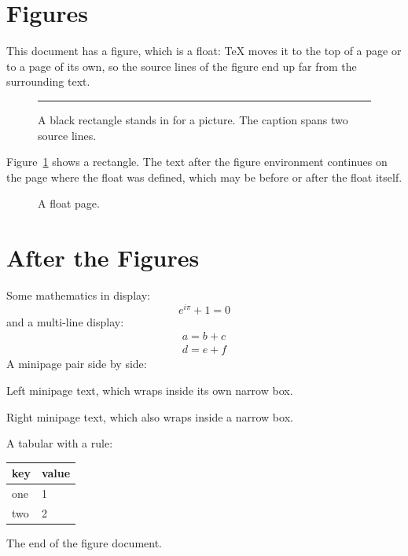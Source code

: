 \documentclass{article}
\begin{document}
\section{Figures}
This document has a figure, which is a float:
TeX moves it to the top of a page or to a page of its own,
so the source lines of the figure end up far from the surrounding text.

\begin{figure}[t]
  \centering
  \rule{0.6\textwidth}{4cm}
  \caption{A black rectangle stands in for a picture.
    The caption spans two source lines.}
  \label{fig:rect}
\end{figure}

Figure~\ref{fig:rect} shows a rectangle.
The text after the figure environment continues on the page where the float was defined,
which may be before or after the float itself.

\begin{figure}[p]
  \centering
  \caption{A float page.}
\end{figure}

\section{After the Figures}
Some mathematics in display:
\[
  e^{i\pi} + 1 = 0
\]
and a multi-line display:
\begin{gather}
  a = b + c \\
  d = e + f
\end{gather}
A minipage pair side by side:

\noindent
\begin{minipage}{0.45\textwidth}
Left minipage text, which wraps inside its own narrow box.
\end{minipage}\hfill
\begin{minipage}{0.45\textwidth}
Right minipage text, which also wraps inside a narrow box.
\end{minipage}

\vspace{1em}
A tabular with a rule:
\begin{center}
\begin{tabular}{|l|l|}
  \hline
  key & value \\
  \hline
  one & 1 \\
  two & 2 \\
  \hline
\end{tabular}
\end{center}
The end of the figure document.
\end{document}
